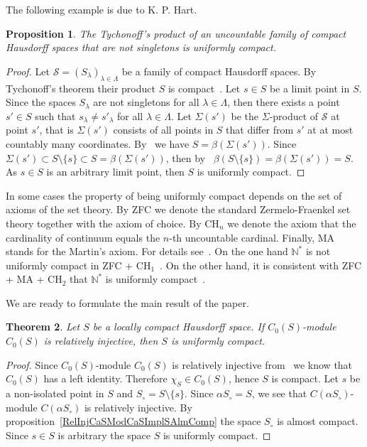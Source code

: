 \documentclass[12pt]{article}
\newtheorem{theorem}{Theorem}[section]
\newtheorem{proposition}[theorem]{Proposition}
\begin{document}
The following example is due to K. P. Hart.

\begin{proposition}\label{UcountProdCompSpIsUnifComp} The Tychonoff's product of
    an uncountable family of compact Hausdorff spaces that are not singletons is
    uniformly compact.
\end{proposition}
\begin{proof} Let $\mathcal{S}={(S_\lambda)}_{\lambda\in\Lambda}$ be a family of
    compact Hausdorff spaces. By Tychonoff's theorem their product $S$ is
    compact~\cite[theorem 3.2.4]{EngkingGenTop}. Let $s\in S$ be a limit point
    in $S$. Since the spaces $S_\lambda$ are not singletons for all
    $\lambda\in\Lambda$, then there exists a point $s'\in S$ such that
    $s_\lambda\neq s'_\lambda$ for all $\lambda\in\Lambda$. Let $\Sigma(s')$ be
    the $\Sigma$-product of $\mathcal{S}$ at point $s'$, that is $\Sigma(s')$
    consists of all points in $S$ that differ from $s'$ at at most countably
    many coordinates. By~\cite[theorem 3.12.24(c)]{EngkingGenTop} we have
    $S=\beta(\Sigma(s'))$. Since $\Sigma(s')\subset S\setminus \{s\}\subset
        S=\beta(\Sigma(s'))$, then by~\cite[corollary 3.6.9]{EngkingGenTop}
    $\beta(S\setminus \{s\})=\beta(\Sigma(s'))=S$. As $s\in S$ is an arbitrary
    limit point, then $S$ is uniformly compact.
\end{proof}

In some cases the property of being uniformly compact depends on the set of
axioms of the set theory. By \textsc{ZFC} we denote the standard
Zermelo-Fraenkel set theory together with the axiom of choice. By
\textsc{CH}$_n$ we denote the axiom that the cardinality of continuum equals the
$n$-th uncountable cardinal. Finally, \textsc{MA} stands for the Martin's axiom.
For details see~\cite{KunSetThIndepPrf}. On the one hand $\mathbb{N}^*$ is not
uniformly compact in \textsc{ZFC + CH$_1$}~\cite{FinGillExtContFuncbN}. On the
other hand, it is consistent with \textsc{ZFC + MA + CH$_2$} that $\mathbb{N}^*$
is uniformly compact~\cite{DouKunMillCStarEmbdDenPropSbspStoneRemN}.

We are ready to formulate the main result of the paper.

\begin{theorem}\label{RelInjCSModCSImplUnifCompS} Let $S$ be a locally compact
    Hausdorff space. If $C_0(S)$-module $C_0(S)$ is relatively injective, then
    $S$ is uniformly compact.
\end{theorem}
\begin{proof} Since $C_0(S)$-module $C_0(S)$ is relatively injective
    from~\cite[corollary 2.2.8 (i)]{RamsHomPropSemgroupAlg} we know that
    $C_0(S)$ has a left identity. Therefore $\chi_S\in C_0(S)$, hence $S$ is
    compact. Let $s$ be a non-isolated point in $S$ and $S_\circ=S\setminus
        \{s\}$. Since $\alpha S_\circ=S$, we see that $C(\alpha S_\circ)$-module
    $C(\alpha S_\circ)$ is relatively injective. By
    proposition~\ref{RelInjCaSModCaSImplSAlmComp} the space $S_\circ$ is almost
    compact. Since $s\in S$ is arbitrary the space $S$ is uniformly compact.
\end{proof}
\end{document}
